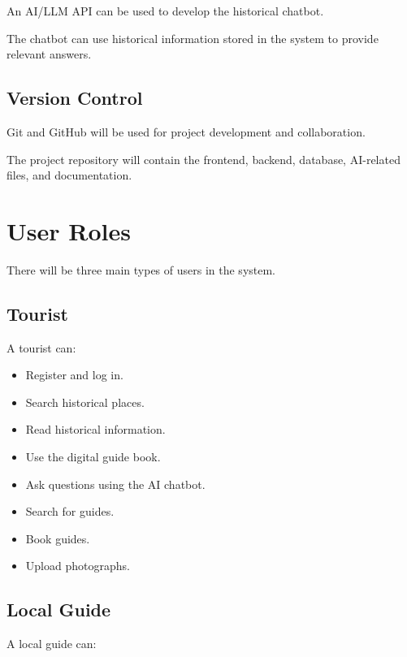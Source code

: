 \documentclass[12pt,a4paper]{article}
\begin{document}
An AI/LLM API can be used to develop the historical chatbot.

The chatbot can use historical information stored in the system to
provide relevant answers.


\subsection{Version Control}

Git and GitHub will be used for project development and collaboration.

The project repository will contain the frontend, backend, database,
AI-related files, and documentation.



\section{User Roles}

There will be three main types of users in the system.


\subsection{Tourist}

A tourist can:

\begin{itemize}[leftmargin=*]

    \item Register and log in.
    \item Search historical places.
    \item Read historical information.
    \item Use the digital guide book.
    \item Ask questions using the AI chatbot.
    \item Search for guides.
    \item Book guides.
    \item Upload photographs.

\end{itemize}


\subsection{Local Guide}

A local guide can:
\end{document}
